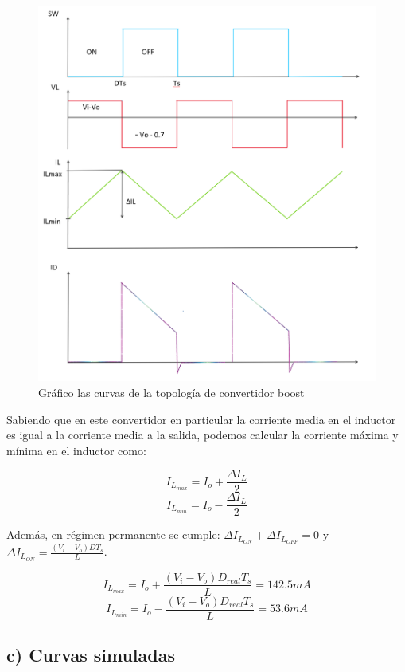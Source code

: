 \documentclass[e4_tp1_main.tex]{subfiles}
\begin{document}
\begin{figure}[H]
  \centering
    \includegraphics[scale = 0.6]{Imagenes/punto2/Dibujo}
  \caption{Gr\'afico las curvas de la topolog\'ia de convertidor boost}
  \label{fig:dibujo}
\end{figure}


Sabiendo que en este convertidor en particular la corriente media en el inductor es igual a la corriente media a la salida, podemos calcular la corriente m\'axima y m\'inima en el inductor como:

$$I_{L_{max}}= I_o + \frac{\Delta I_L}{2}$$
$$I_{L_{min}}= I_o - \frac{\Delta I_L}{2}$$

Adem\'as, en r\'egimen permanente se cumple: $\Delta I_{L_{ON}}+\Delta I_{L_{OFF}}=0$ y $\Delta I_{L_{ON}}=\frac{(V_i-V_o)DT_s}{L}$.

$$I_{L_{max}}= I_o + \frac{(V_i-V_o)D_{real}T_s}{L}=142.5mA$$
$$I_{L_{min}}= I_o - \frac{(V_i-V_o)D_{real}T_s}{L}=53.6mA$$



\subsection*{c) Curvas simuladas}
\end{document}
